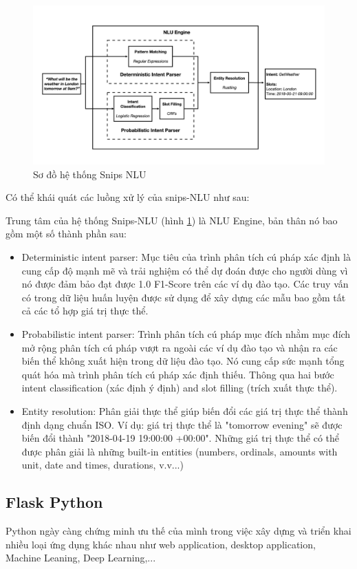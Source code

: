 \begin{figure}[htp]
    \centering
    \includegraphics[width=15cm]{images/Snips-NLU.png}
    \caption{Sơ đồ hệ thống Snips NLU}
    \label{fig:snips-nlu}
\end{figure}

Có thể khái quát các luồng xử lý của snips-NLU \cite{snips-nlu} như sau:

Trung tâm của hệ thống Snips-NLU (hình \ref{fig:snips-nlu}) là NLU Engine, bản thân nó bao gồm một số thành phần sau:
\begin{itemize}
    \item Deterministic intent parser: Mục tiêu của trình phân tích cú pháp xác định là cung cấp độ mạnh mẽ và trải nghiệm có thể dự đoán được cho người dùng vì nó được đảm bảo đạt được 1.0 F1-Score trên các ví dụ đào tạo. Các truy vấn có trong dữ liệu huấn luyện được sử dụng để xây dựng các mẫu bao gồm tất cả các tổ hợp giá trị thực thể.
    \item Probabilistic intent parser: Trình phân tích cú pháp mục đích nhằm mục đích mở rộng phân tích cú pháp vượt ra ngoài các ví dụ đào tạo và nhận ra các biến thể không xuất hiện trong dữ liệu đào tạo. Nó cung cấp sức mạnh tổng quát hóa mà trình phân tích cú pháp xác định thiếu. Thông qua hai bước intent classification (xác định ý định) and slot filling (trích xuất thực thể).
    \item Entity resolution: Phân giải thực thể giúp biến đổi các giá trị thực thể thành định dạng chuẩn ISO. Ví dụ: giá trị thực thể là "tomorrow evening" sẽ được biến đổi thành "2018-04-19 19:00:00 +00:00". Những giá trị thực thể có thể được phân giải là những built-in entities (numbers, ordinals, amounts with unit, date and times, durations, v.v...)
\end{itemize}

\subsection{Flask Python}
Python ngày càng chứng minh ưu thế của mình trong việc xây dựng và triển khai nhiều loại ứng dụng khác nhau như web application, desktop application, Machine Leaning, Deep Learning,...

